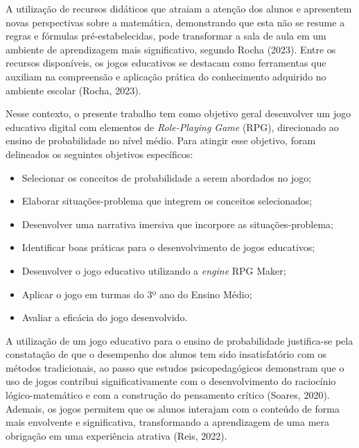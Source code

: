 A utilização de recursos didáticos que atraiam a atenção dos alunos e apresentem novas perspectivas sobre a matemática, demonstrando que esta não se resume a regras e fórmulas pré-estabelecidas, pode transformar a sala de aula em um ambiente de aprendizagem mais significativo, segundo Rocha (2023). Entre os recursos disponíveis, os jogos educativos se destacam como ferramentas que auxiliam na compreensão e aplicação prática do conhecimento adquirido no ambiente escolar (Rocha, 2023). %

Nesse contexto, o presente trabalho tem como objetivo geral desenvolver um jogo educativo digital com elementos de \textit{Role-Playing Game} (RPG), direcionado ao ensino de probabilidade no nível médio. Para atingir esse objetivo, foram delineados os seguintes objetivos específicos: 

        \begin{itemize}
        	
        	\item Selecionar os conceitos de probabilidade a serem abordados no jogo;
            \item Elaborar situações-problema que integrem os conceitos selecionados;
            \item Desenvolver uma narrativa imersiva que incorpore as situações-problema; 
            \item Identificar boas práticas para o desenvolvimento de jogos educativos; 
            \item Desenvolver o jogo educativo utilizando a \textit{engine} RPG Maker; 
            \item Aplicar o jogo em turmas do 3º ano do Ensino Médio; 
            \item Avaliar a eficácia do jogo desenvolvido.
            
        \end{itemize}
        
A utilização de um jogo educativo para o ensino de probabilidade justifica-se pela constatação de que o desempenho dos alunos tem sido insatisfatório com os métodos tradicionais, ao passo que estudos psicopedagógicos demonstram que o uso de jogos contribui significativamente com o desenvolvimento do raciocínio lógico-matemático e com a construção do pensamento crítico (Soares, 2020). Ademais, os jogos permitem que os alunos interajam com o conteúdo de forma mais envolvente e significativa, transformando a aprendizagem de uma mera obrigação em uma experiência atrativa (Reis, 2022).

